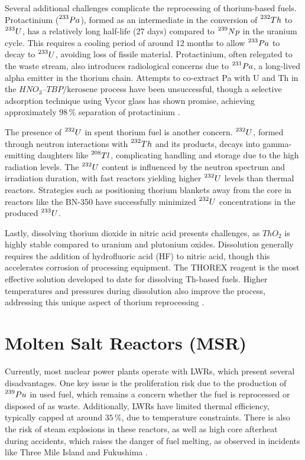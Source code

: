 Several additional challenges complicate the reprocessing of thorium-based fuels. Protactinium (\(\prescript{233}{}{Pa}\)), formed as an intermediate in the conversion of \(\prescript{232}{}{Th}\) to \(\prescript{233}{}{U}\), has a relatively long half-life (27 days) compared to \(\prescript{239}{}{Np}\) in the uranium cycle. This requires a cooling period of around 12 months to allow \(\prescript{233}{}{Pa}\) to decay to \(\prescript{233}{}{U}\), avoiding loss of fissile material. Protactinium, often relegated to the waste stream, also introduces radiological concerns due to \(\prescript{231}{}{Pa}\), a long-lived alpha emitter in the thorium chain. Attempts to co-extract Pa with U and Th in the \(HNO_3–TBP/\text{kerosene}\) process have been unsuccessful, though a selective adsorption technique using Vycor glass has shown promise, achieving approximately \(98 \, \%\) separation of protactinium \cite{IAEA_Th_Potential}.

The presence of \(\prescript{232}{}{U}\) in spent thorium fuel is another concern. \(\prescript{232}{}{U}\), formed through neutron interactions with \(\prescript{232}{}{Th}\) and its products, decays into gamma-emitting daughters like \(\prescript{208}{}{Tl}\), complicating handling and storage due to the high radiation levels. The \(\prescript{232}{}{U}\) content is influenced by the neutron spectrum and irradiation duration, with fast reactors yielding higher \(\prescript{232}{}{U}\) levels than thermal reactors. Strategies such as positioning thorium blankets away from the core in reactors like the BN-350 have successfully minimized \(\prescript{232}{}{U}\) concentrations in the produced \(\prescript{233}{}{U}\).

Lastly, dissolving thorium dioxide in nitric acid presents challenges, as \(ThO_2\) is highly stable compared to uranium and plutonium oxides. Dissolution generally requires the addition of hydrofluoric acid (HF) to nitric acid, though this accelerates corrosion of processing equipment. The THOREX reagent is the most effective solution developed to date for dissolving Th-based fuels. Higher temperatures and pressures during dissolution also improve the process, addressing this unique aspect of thorium reprocessing \cite{IAEA_Th_Potential}.

\section{Molten Salt Reactors (MSR)}

Currently, most nuclear power plants operate with LWRs, which present several disadvantages. One key issue is the proliferation risk due to the production of \(\prescript{239}{}{Pu}\) in used fuel, which remains a concern whether the fuel is reprocessed or disposed of as waste. Additionally, LWRs have limited thermal efficiency, typically capped at around \(35\,\%\), due to temperature constraints. There is also the risk of steam explosions in these reactors, as well as high core afterheat during accidents, which raises the danger of fuel melting, as observed in incidents like Three Mile Island and Fukushima \cite{TMSR_book}.

